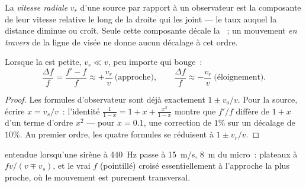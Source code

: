 \begin{definition}\label{def:g12:doppler-effect:radial}
La \emph{vitesse radiale} $v_r$ d'une source
par rapport à un observateur est la composante de leur vitesse
relative le long de la droite qui les joint --- le taux auquel la
distance diminue ou croît. Seule cette composante décale la
~; un mouvement \emph{en travers} de la ligne de
visée ne donne aucun décalage à cet ordre.
\end{definition}

\begin{proposition}\label{prop:g12:doppler-effect:slow}
Lorsque la  est petite, $v_r \ll v$, peu importe qui
bouge~:
\[
\frac{\Delta f}{f} = \frac{f' - f}{f} \approx +\frac{v_r}{v} \ \text{(approche)},
\qquad
\frac{\Delta f}{f} \approx -\frac{v_r}{v} \ \text{(éloignement)}.
\]
\end{proposition}

\begin{proof}
Les formules d'observateur sont déjà exactement $1 \pm v_o/v$. Pour la
source, écrire $x = v_s/v$~: l'identité
$\frac{1}{1 - x} = 1 + x + \frac{x^2}{1 - x}$ montre que $f'/f$
diffère de $1 + x$ d'un terme d'ordre $x^2$ --- pour $x = 0.1$, une
correction de $1\%$ sur un décalage de $10\%$. Au premier ordre, les
quatre formules se réduisent à $1 \pm v_r/v$.
\end{proof}

\begin{omfigure}

{\small {} entendue lorsqu'une sirène à \qty{440}{Hz}
passe à \qty{15}{m/s}, \qty{8}{m} du micro~: plateaux à
$fv/(v \mp v_s)$, et le vrai $f$ (pointillé) croisé essentiellement
à l'approche la plus proche, où le mouvement est purement
transversal.}
\end{omfigure}

